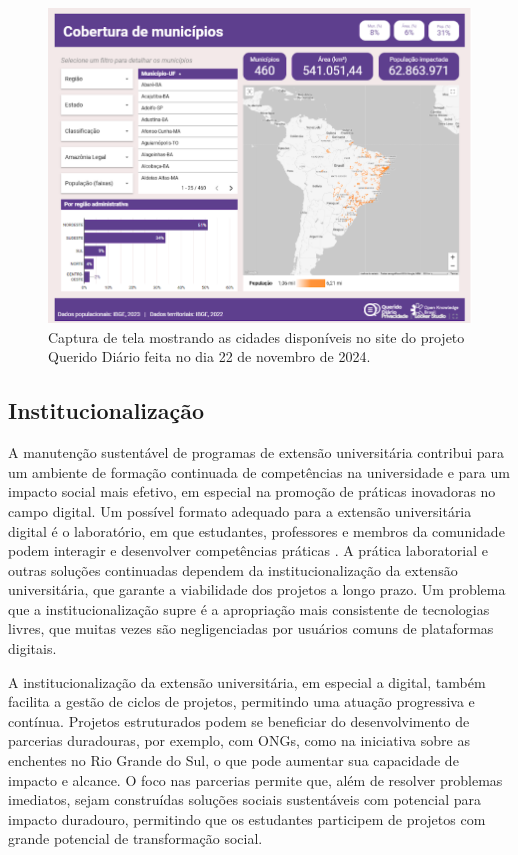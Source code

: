 \documentclass[portuguese]{textolivre}
\begin{document}
\begin{figure}[htbp]
\centering
\begin{minipage}{.75\textwidth}
 \includegraphics[width=\textwidth]{figure02.png}
 \caption{Captura de tela mostrando as cidades disponíveis no site do
projeto Querido Diário feita no dia 22 de novembro de 2024.}
 \label{fig02}
\end{minipage}
\end{figure}


\subsection{Institucionalização}

A manutenção sustentável de programas de extensão universitária
contribui para um ambiente de formação continuada de competências na
universidade e para um impacto social mais efetivo, em especial na
promoção de práticas inovadoras no campo digital. Um possível formato
adequado para a extensão universitária digital é o laboratório, em que
estudantes, professores e membros da comunidade podem interagir e
desenvolver competências práticas \cite{Girardi2024}. A
prática laboratorial e outras soluções continuadas dependem da
institucionalização da extensão universitária, que garante a viabilidade
dos projetos a longo prazo. Um problema que a institucionalização supre
é a apropriação mais consistente de tecnologias livres, que muitas vezes
são negligenciadas por usuários comuns de plataformas digitais.

A institucionalização da extensão universitária, em especial a digital,
também facilita a gestão de ciclos de projetos, permitindo uma atuação
progressiva e contínua. Projetos estruturados podem se beneficiar do
desenvolvimento de parcerias duradouras, por exemplo, com ONGs, como na
iniciativa sobre as enchentes no Rio Grande do Sul, o que pode aumentar
sua capacidade de impacto e alcance. O foco nas parcerias permite que,
além de resolver problemas imediatos, sejam construídas soluções sociais
sustentáveis com potencial para impacto duradouro, permitindo que os
estudantes participem de projetos com grande potencial de transformação
social.
\end{document}
